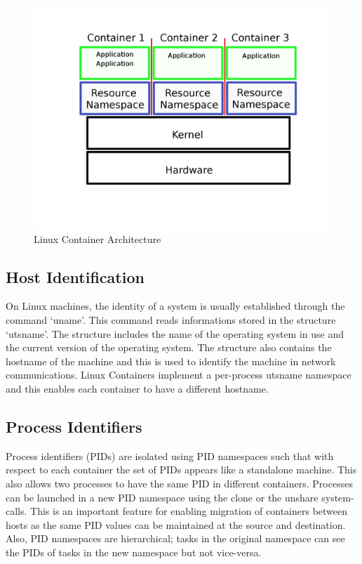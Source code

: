 \begin{figure}[tbh]
\centering
\includegraphics[width=1.0\columnwidth]{containers}
\caption{Linux Container Architecture}
\label{fig:containers}
\end{figure}


\subsection{Host Identification}
On Linux machines, the identity of a system is usually established through the command `uname'. This command reads informations stored in the structure `utsname'. The structure includes the name of the operating system in use and the current version of the operating system. The structure also contains the hostname of the machine and this is used to identify the machine in network communications. Linux Containers implement a per-process utsname namespace and this enables each container to have a different hostname.

\subsection{Process Identifiers}
Process identifiers (PIDs) are isolated using PID namespaces such that with respect to each container the set of PIDs appears like a standalone machine. This also allows two processes to  have the same PID in different containers. Processes can be launched in a new PID namespace using the clone or the unshare system-calls. This is an important feature for enabling migration of containers between hosts as the same PID values can be maintained at the source and destination. Also, PID namespaces are hierarchical; tasks in the original namespace can see the PIDs of tasks in the new namespace but not vice-versa.  

